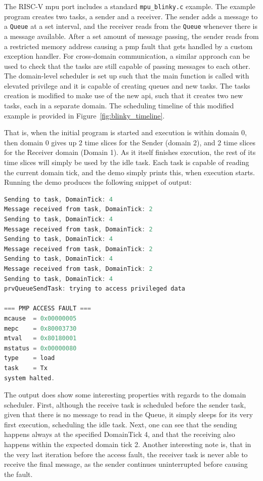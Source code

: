 The RISC-V mpu port includes a standard \texttt{mpu\_blinky.c} example. The
example program creates two tasks, a sender and a receiver. The sender adds a
message to a \texttt{Queue} at a set interval, and the receiver reads from the
\texttt{Queue} whenever there is a message available. After a set amount of
message passing, the sender reads from a restricted memory address causing a
pmp fault that gets handled by a custom exception handler. For cross-domain
communication, a similar approach can be used to check that the tasks are still
capable of passing messages to each other. The domain-level scheduler is set up
such that the main function is called with elevated privilege and it is
capable of creating queues and new tasks. The tasks creation is modified to
make use of the new api, such that it creates two new tasks, each in a separate
domain. The scheduling timeline of this modified example is provided in
Figure~\ref{fig:blinky_timeline}.

That is, when the initial program is started and execution is within domain 0,
then domain 0 gives up 2 time slices for the Sender (domain 2), and 2 time
slices for the Receiver domain (Domain 1). As it itself finishes execution, the
rest of its time slices will simply be used by the idle task. Each task is
capable of reading the current domain tick, and the demo simply prints this,
when execution starts. Running the demo produces the following snippet of
output:
\begin{lstlisting}[language={c}]
Sending to task, DomainTick: 4
Message received from task, DomainTick: 2
Sending to task, DomainTick: 4
Message received from task, DomainTick: 2
Sending to task, DomainTick: 4
Message received from task, DomainTick: 2
Sending to task, DomainTick: 4
Message received from task, DomainTick: 2
Sending to task, DomainTick: 4
prvQueueSendTask: trying to access privileged data

=== PMP ACCESS FAULT ===
mcause  = 0x00000005
mepc    = 0x80003730
mtval   = 0x80180001
mstatus = 0x00000080
type    = load
task    = Tx
system halted.
\end{lstlisting}

The output does show some interesting properties with regards to the domain
scheduler. First, although the receive task is scheduled before the sender
task, given that there is no message to read in the Queue, it simply sleeps for
its very first execution, scheduling the idle task. Next, one can see that the
sending happens always at the specified DomainTick 4, and that the receiving
also happens within the expected domain tick 2. Another interesting note is,
that in the very last iteration before the access fault, the receiver task is
never able to receive the final message, as the sender continues uninterrupted
before causing the fault.


